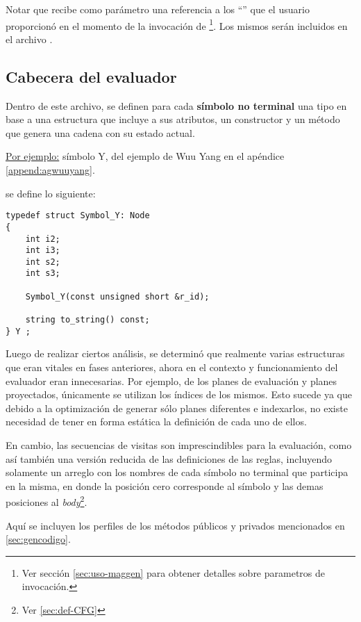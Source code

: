 Notar que recibe como parámetro una referencia a los ``'' que el usuario proporcionó en el momento de la invocación de \maggen \footnote{Ver sección \ref{sec:uso-maggen} para obtener detalles sobre parametros de invocación.}. Los mismos serán incluidos en el archivo .

\subsection{Cabecera del evaluador}

Dentro de este archivo, se definen para cada \textbf{símbolo no terminal} una tipo en base a una estructura que incluye a sus atributos, un constructor y un método  que genera una cadena con su estado actual.

\underline{Por ejemplo:} símbolo Y, del ejemplo de Wuu Yang en el apéndice \ref{append:agwuuyang}.
\begin{center}\end{center}
se define lo siguiente:
\begin{lstlisting}[columns=fullflexible, linewidth=7.3cm]
typedef struct Symbol_Y: Node
{
    int i2;
    int i3;
    int s2;
    int s3;

    Symbol_Y(const unsigned short &r_id);

    string to_string() const;
} Y ;
\end{lstlisting}

Luego de realizar ciertos análisis, se determinó que realmente varias estructuras que eran vitales en fases anteriores, ahora en el contexto y funcionamiento del evaluador eran innecesarias. Por ejemplo, de los planes de evaluación y planes proyectados, únicamente se utilizan los índices de los mismos. Esto sucede ya que debido a la optimización de generar sólo planes diferentes e indexarlos, no existe necesidad de tener en forma estática la definición de cada uno de ellos.

En cambio, las secuencias de visitas son imprescindibles para la evaluación, como así también una versión reducida de las definiciones de las reglas, incluyendo solamente un arreglo con los nombres de cada símbolo no terminal que participa en la misma, en donde la posición cero corresponde al símbolo  y las demas posiciones al \textit{body}\footnote{Ver \ref{sec:def-CFG}}.

Aquí se incluyen los perfiles de los métodos públicos y privados mencionados en \ref{sec:gencodigo}.

